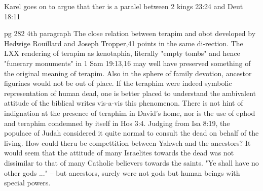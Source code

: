 \documentclass[11pt]{article}
\begin{document}
{Karel goes on to argue that ther is a paralel between 2 kings 23:24 and Deut 18:11


pg 282 4th paragraph
The close relation between terapim and obot developed by Hedwige Rouillard and Joseph Tropper,41 points in the same di-rection. The LXX rendering of terapim as kenotaphia, literally "empty tombs" and hence "funerary monuments" in 1 Sam 19:13,16 may well have preserved something of the original meaning of terapim. Also in the sphere of family devotion, ancestor figurines would not be out of place. If the teraphim were indeed symbolic representation of human dead, one is better placed to understand the ambivalent attitude of the biblical writes vis-a-vis this phenomenon. There is not hint of indignation at the presence of teraphim in David's home, nor is the use of ephod and teraphim condemned by itself in Hos 3:4. Judging from Isa 8:19, the populace of Judah considered it quite normal to consult the dead on behalf of the living. How could theru be compettition between Yahweh and the ancestors? It would seem that the attitude of many Israelites towards the dead was not dissimilar to that of many Catholic believers towards the saints. "Ye shall have no other gods ..." -- but ancestors, surely were not gods but human beings with special powers. 


}
\end{document}
